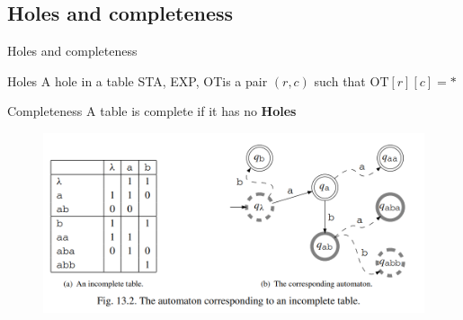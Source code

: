 \documentclass[aspectratio=169,xcolor=dvipsnames]{beamer}
\def\OT{\textlangle STA, EXP, OT\textrangle }
\begin{document}
\subsection{Holes and completeness}
\begin{frame}[t]{Holes and completeness}


\begin{block}{Holes}
A hole in a table \OT is a pair $(r, c)$ such that $\text{OT}[r][c] = *$
\end{block}

\begin{block}{Completeness}
A table is complete if it has no \textbf{Holes}
\end{block}

\begin{figure}
    \centering
    \includegraphics[width=0.6\linewidth]{images/fig13_2.png}
\end{figure}

\end{frame}
\end{document}
